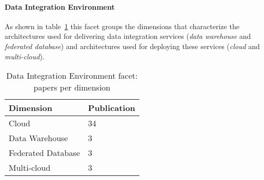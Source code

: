 \paragraph{Data Integration Environment}  
As shown in table~\ref{table:dienviron} this facet groups the dimensions that characterize the architectures used for delivering data integration services ({\em data warehouse} and  {\em federated database}) and  architectures used for deploying these services ({\em cloud} and {\em multi-cloud}).

\begin{table}[!h]
\begin{center}
\begin{tabular}{p{4cm}p{4cm}}
\hline 
\textbf{Dimension} & \textbf{Publication} \\ 
\hline 
Cloud & 34 \\ 
\hline 
Data Warehouse & 3 \\ 
\hline 
Federated Database & 3 \\ 
\hline 
Multi-cloud & 3 \\ 
\hline 
\end{tabular}
\end{center}
\caption{Data Integration Environment facet:  papers per dimension}\label{table:dienviron}
\end{table}

